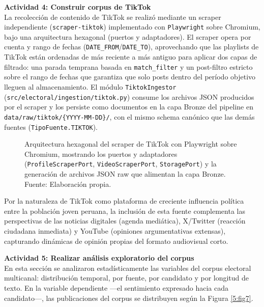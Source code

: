 \textbf{Actividad 4: Construir corpus de TikTok}
\\
La recolección de contenido de TikTok se realizó mediante un scraper independiente
(\texttt{scraper-tiktok}) implementado con \texttt{Playwright} sobre Chromium, bajo una
arquitectura hexagonal (puertos y adaptadores). El scraper opera por cuenta y rango de
fechas (\texttt{DATE\_FROM}/\texttt{DATE\_TO}), aprovechando que las playlists de TikTok
están ordenadas de más reciente a más antiguo para aplicar dos capas de filtrado: una
parada temprana basada en \texttt{match\_filter} y un post-filtro estricto sobre el
rango de fechas que garantiza que solo posts dentro del período objetivo lleguen al
almacenamiento. El módulo \texttt{TiktokIngestor}
(\texttt{src/electoral/ingestion/tiktok.py}) consume los archivos JSON producidos por
el scraper y los persiste como documentos en la capa Bronze del pipeline en
\texttt{data/raw/tiktok/\{YYYY-MM-DD\}/}, con el mismo schema canónico que las demás
fuentes (\texttt{TipoFuente.TIKTOK}).

\begin{figure}[!ht]
    \begin{center}
        \resizebox{0.85\textwidth}{!}{}
        \caption[Arquitectura hexagonal del scraper de TikTok con Playwright]{Arquitectura hexagonal del scraper de TikTok con Playwright sobre Chromium, mostrando los puertos y adaptadores (\texttt{ProfileScraperPort}, \texttt{VideoScraperPort}, \texttt{StoragePort}) y la generación de archivos JSON raw que alimentan la capa Bronze.\\
            Fuente: Elaboración propia.}
        \label{5:fig6b}
    \end{center}
\end{figure}

Por la naturaleza de TikTok como plataforma de creciente influencia política entre la
población joven peruana, la inclusión de esta fuente complementa las perspectivas de
las noticias digitales (agenda mediática), X/Twitter (reacción ciudadana inmediata) y
YouTube (opiniones argumentativas extensas), capturando dinámicas de opinión propias
del formato audiovisual corto.

\textbf{Actividad 5: Realizar análisis exploratorio del corpus}
\\
En esta sección se analizaron estadísticamente las variables del corpus electoral
multicanal: distribución temporal, por fuente, por candidato y por longitud de texto.
En la variable dependiente —el sentimiento expresado hacia cada candidato—, las
publicaciones del corpus se distribuyen según la Figura \ref{5:fig7}.

